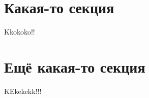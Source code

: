 \section{Какая-то секция}\label{dga}

Kkokoko!!

\clearpage

\section{Ещё какая-то секция}\label{be_class}

KEkekekk!!!

\clearpage
